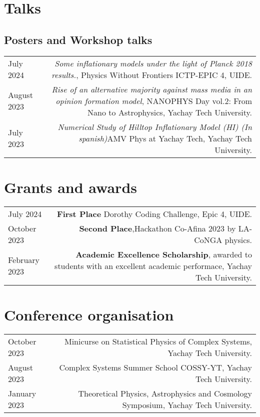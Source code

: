 \documentclass{article}
\begin{document}
\section*{Talks}
\subsection*{Posters and Workshop talks}
\begin{tabular}{L!{\vrule}R}

    July 2024 & \textit{Some inflationary models under the light of Planck 2018 results.}, Physics Without Frontiers ICTP-EPIC 4, UIDE. \\

    August 2023 & \textit{Rise of an alternative majority against mass media in an opinion formation model}, NANOPHYS Day vol.2: From Nano to Astrophysics, Yachay Tech University. \\

    July 2023 & \textit{Numerical Study of Hilltop Inflationary Model (HI) (In spanish)}AMV Phys at Yachay Tech, Yachay Tech University. \\

    

\end{tabular}


\section*{Grants and awards}

\begin{tabular}{L!{\vrule}R}
    July 2024 & \textbf{First Place} Dorothy Coding Challenge, Epic 4, UIDE. \\
    October 2023 & \textbf{Second Place},Hackathon Co-Afina 2023 by LA-CoNGA physics. \\
    February 2023 & \textbf{Academic Excellence Scholarship}, awarded to students with an excellent academic performace, Yachay Tech University. \\
    
\end{tabular}


\section*{Conference organisation}

\begin{tabular}{L!{\vrule}R}
  October 2023  & Minicurse on Statistical Physics of Complex Systems, Yachay Tech University. \\
  August 2023  & Complex Systems Summer School COSSY-YT, Yachay Tech University. \\
  January 2023 & Theoretical Physics, Astrophysics and Cosmology Symposium, Yachay Tech University.\\
\end{tabular}
\end{document}
